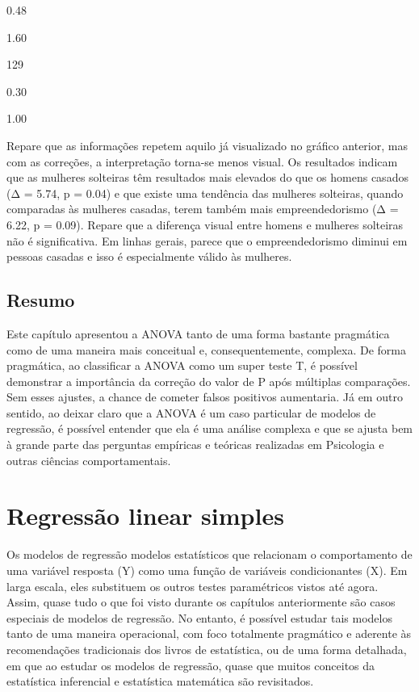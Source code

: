 \documentclass[
]{book}
\begin{document}
0.48

1.60

129

0.30

1.00

Repare que as informações repetem aquilo já visualizado no gráfico anterior, mas com as correções, a interpretação torna-se menos visual. Os resultados indicam que as mulheres solteiras têm resultados mais elevados do que os homens casados (Δ = 5.74, p = 0.04) e que existe uma tendência das mulheres solteiras, quando comparadas às mulheres casadas, terem também mais empreendedorismo (Δ = 6.22, p = 0.09). Repare que a diferença visual entre homens e mulheres solteiras não é significativa. Em linhas gerais, parece que o empreendedorismo diminui em pessoas casadas e isso é especialmente válido às mulheres.

\hypertarget{resumo-2}{%
\section{Resumo}\label{resumo-2}}

Este capítulo apresentou a ANOVA tanto de uma forma bastante pragmática como de uma maneira mais conceitual e, consequentemente, complexa. De forma pragmática, ao classificar a ANOVA como um super teste T, é possível demonstrar a importância da correção do valor de P após múltiplas comparações. Sem esses ajustes, a chance de cometer falsos positivos aumentaria. Já em outro sentido, ao deixar claro que a ANOVA é um caso particular de modelos de regressão, é possível entender que ela é uma análise complexa e que se ajusta bem à grande parte das perguntas empíricas e teóricas realizadas em Psicologia e outras ciências comportamentais.

\hypertarget{regressuxe3o-linear-simples}{%
\chapter{Regressão linear simples}\label{regressuxe3o-linear-simples}}

Os modelos de regressão modelos estatísticos que relacionam o comportamento de uma variável resposta (Y) como uma função de variáveis condicionantes (X). Em larga escala, eles substituem os outros testes paramétricos vistos até agora. Assim, quase tudo o que foi visto durante os capítulos anteriormente são casos especiais de modelos de regressão. No entanto, é possível estudar tais modelos tanto de uma maneira operacional, com foco totalmente pragmático e aderente às recomendações tradicionais dos livros de estatística, ou de uma forma detalhada, em que ao estudar os modelos de regressão, quase que muitos conceitos da estatística inferencial e estatística matemática são revisitados.
\end{document}
